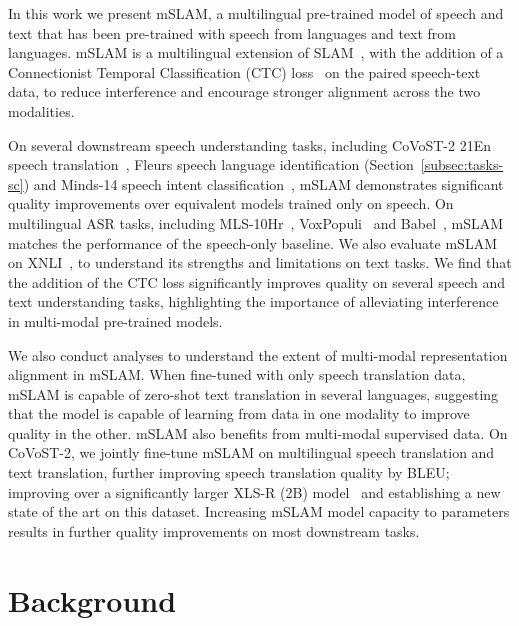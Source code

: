 \documentclass[nohyperref]{article}
\newcommand{\xlsrp}{XLS-R}
\newcommand{\xlsrpb}[1]{\xlsrp{} {(#1B)}}
\newcommand{\mslam}{mSLAM}
\begin{document}
In this work we present \mslam{}, a multilingual pre-trained model of speech and text that has been pre-trained with speech from  languages and text from  languages. \mslam{} is a multilingual extension of SLAM~\citep{bapna2021slam}, with the addition of a Connectionist Temporal Classification (CTC) loss~\citep{graves2006connectionist} on the paired speech-text data, to reduce interference and encourage stronger alignment across the two modalities.

On several downstream speech understanding tasks, including CoVoST-2 21En speech translation~\cite{wang2020covost},  Fleurs speech language identification (Section~\ref{subsec:tasks-sc}) and Minds-14 speech intent classification~\cite{gerz2021multilingual}, \mslam{} demonstrates significant quality improvements over equivalent models trained only on speech. On multilingual ASR tasks, including MLS-10Hr~\citep{pratap2020mls}, VoxPopuli~\citep{wang2021voxpopuli} and Babel~\citep{Gales2014SpeechRA}, \mslam{} matches the performance of the speech-only baseline. We also evaluate \mslam{} on XNLI~\cite{conneau2018xnli}, to understand its strengths and limitations on text tasks.
We find that the addition of the CTC loss significantly improves quality on several speech and text understanding tasks, highlighting the importance of alleviating interference in multi-modal pre-trained models.

We also conduct analyses to understand the extent of multi-modal representation alignment in \mslam{}. When fine-tuned with only speech translation data, \mslam{} is capable of zero-shot text translation in several languages, suggesting that the model is capable of learning from data in one modality to improve quality in the other. \mslam{} also benefits from multi-modal supervised data. On CoVoST-2, we jointly fine-tune \mslam{} on multilingual speech translation and text translation, further improving speech translation quality by  BLEU; improving over a significantly larger \xlsrpb{2} model~\citep{babu2021xls} and establishing a new state of the art on this dataset. Increasing \mslam{} model capacity to  parameters results in further quality improvements on most downstream tasks.













\section{Background}
\label{sec:background}
\end{document}
